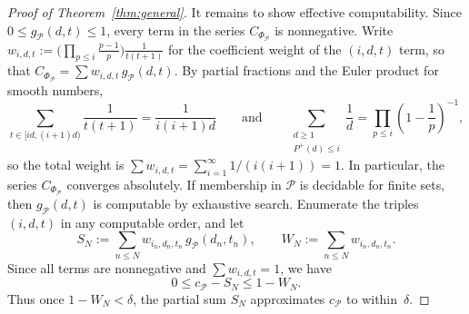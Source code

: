\documentclass[11pt]{amsart}
\begin{document}
\begin{proof}[Proof of Theorem~\ref{thm:general}]
It remains to show effective computability. Since \(0\le g_{\mathcal{P}}(d,t)\le 1\), every term in the series \(C_{\Phi_{\mathcal{P}}}\) is nonnegative. Write \(w_{i,d,t}:=\bigl(\prod_{p\le i}\tfrac{p-1}{p}\bigr)\tfrac{1}{t(t+1)}\) for the coefficient weight of the \((i,d,t)\) term, so that \(C_{\Phi_{\mathcal{P}}}=\sum w_{i,d,t}\,g_{\mathcal{P}}(d,t)\). By partial fractions and the Euler product for smooth numbers,
\begin{equation}\label{eq:weight}
\sum_{t\in[id,(i+1)d)} \frac{1}{t(t+1)}=\frac{1}{i(i+1)d}
\qquad\text{and}\qquad
\sum_{\substack{d\ge 1\\ P^+(d)\le i}} \frac{1}{d}=\prod_{p\le i}\!\left(1-\frac{1}{p}\right)^{-1}\!,
\end{equation}
so the total weight is \(\sum w_{i,d,t}=\sum_{i=1}^{\infty}1/(i(i+1))=1\). In particular, the series \(C_{\Phi_{\mathcal{P}}}\) converges absolutely. If membership in \(\mathcal{P}\) is decidable for finite sets, then \(g_{\mathcal{P}}(d,t)\) is computable by exhaustive search. Enumerate the triples \((i,d,t)\) in any computable order, and let
\[
S_N:=\sum_{n\le N} w_{i_n,d_n,t_n}\,g_{\mathcal{P}}(d_n,t_n),
\qquad
W_N:=\sum_{n\le N} w_{i_n,d_n,t_n}.
\]
Since all terms are nonnegative and \(\sum w_{i,d,t}=1\), we have
\[
0\le c_{\mathcal{P}}-S_N\le 1-W_N.
\]
Thus once \(1-W_N<\delta\), the partial sum \(S_N\) approximates \(c_{\mathcal{P}}\) to within~\(\delta\).


\end{proof}
\end{document}
